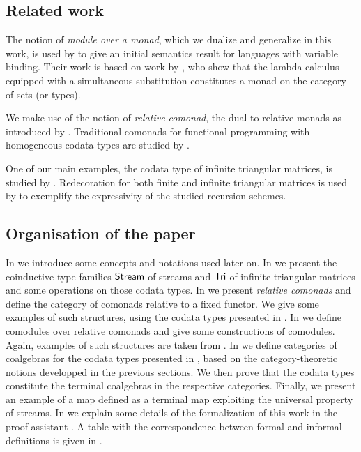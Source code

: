 \documentclass{amsart}
\begin{document}
 \subsection*{Related work}
 The notion of \emph{module over a monad}, which we dualize and generalize in this work, is used by \textcite{DBLP:journals/iandc/HirschowitzM10}
 to give an initial semantics result for languages with variable binding. 
 Their work is based on work by \textcite{alt_reus},
 who show that the lambda calculus equipped with a simultaneous substitution constitutes a monad on the category of sets (or types).
 
 We make use of the notion of \emph{relative comonad}, the dual to relative monads as introduced by \textcite{DBLP:conf/fossacs/AltenkirchCU10}.
 Traditional comonads for functional programming with homogeneous codata types are studied by \textcite{DBLP:conf/sfp/UustaluV01}.
 
 One of our main examples, the codata type of infinite triangular matrices, is studied by \textcite{DBLP:conf/types/MatthesP11}.
 Redecoration for both finite and infinite triangular matrices is used by \textcite{DBLP:journals/tcs/AbelMU05} to exemplify 
 the expressivity of the studied recursion schemes.
 
 
 \subsection*{Organisation of the paper}
  In  we introduce some concepts and notations used later on.
  In  we present the coinductive type families $\mathsf{Stream}$ of streams and $\mathsf{Tri}$ of infinite triangular matrices and some operations on those
           codata types.
  In  we present \emph{relative comonads} and define the category of comonads relative to a fixed functor.
    We give some examples of such structures, using the codata types presented in .
  In  we define comodules over relative comonads and give some constructions of comodules.
     Again, examples of such structures are taken from .
  In  we define categories of coalgebras for the codata types presented in ,
      based on the category-theoretic notions developped in the previous sections.
      We then prove that the codata types constitute the terminal coalgebras in the respective categories.
      Finally, we present an example of a map defined as a terminal map exploiting the universal property of streams.
   In  we explain some details of the formalization of this work in the proof assistant \coq.
  A table with the correspondence between formal and informal definitions is given in .
 
\end{document}
